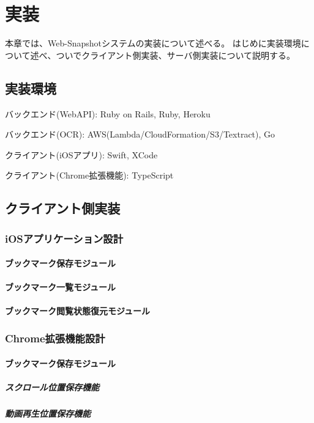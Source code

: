 \chapter{実装}
\label{chap:implementation}
本章では、Web-Snapshotシステムの実装について述べる。
はじめに実装環境について述べ、ついでクライアント側実装、サーバ側実装について説明する。

\section{実装環境}
バックエンド(WebAPI): Ruby on Rails, Ruby, Heroku

バックエンド(OCR): AWS(Lambda/CloudFormation/S3/Textract), Go

クライアント(iOSアプリ): Swift, XCode

クライアント(Chrome拡張機能): TypeScript

\section{クライアント側実装}
\subsection{iOSアプリケーション設計}
\subsubsection{ブックマーク保存モジュール}
\subsubsection{ブックマーク一覧モジュール}
\subsubsection{ブックマーク閲覧状態復元モジュール}

\subsection{Chrome拡張機能設計}
\subsubsection{ブックマーク保存モジュール}
\paragraph{スクロール位置保存機能}
\paragraph{動画再生位置保存機能}

